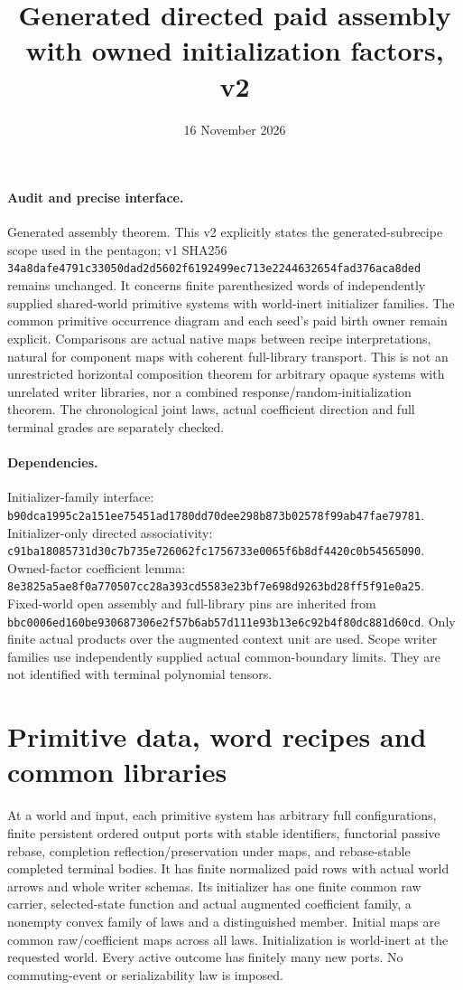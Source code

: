 \documentclass[11pt]{article}
\title{Generated directed paid assembly with owned initialization factors, v2}
\date{16 November 2026}
\begin{document}
\maketitle
\paragraph{Audit and precise interface.} Generated assembly theorem. This v2 explicitly states the generated-subrecipe scope used in the pentagon; v1 SHA256 \texttt{34a8dafe4791c33050dad2d5602f6192499ec713e2244632654fad376aca8ded} remains unchanged. It concerns finite parenthesized words of independently supplied shared-world primitive systems with world-inert initializer families. The common primitive occurrence diagram and each seed's paid birth owner remain explicit. Comparisons are actual native maps between recipe interpretations, natural for component maps with coherent full-library transport. This is not an unrestricted horizontal composition theorem for arbitrary opaque systems with unrelated writer libraries, nor a combined response/random-initialization theorem. The chronological joint laws, actual coefficient direction and full terminal grades are separately checked.

\paragraph{Dependencies.} Initializer-family interface: \texttt{b90dca1995c2a151ee75451ad1780dd70dee298b873b02578f99ab47fae79781}. Initializer-only directed associativity: \texttt{c91ba18085731d30c7b735e726062fc1756733e0065f6b8df4420c0b54565090}. Owned-factor coefficient lemma: \texttt{8e3825a5ae8f0a770507cc28a393cd5583e23bf7e698d9263bd28ff5f91e0a25}. Fixed-world open assembly and full-library pins are inherited from \texttt{bbc0006ed160be930687306e2f57b6ab57d111e93b13e6c92b4f80dc881d60cd}. Only finite actual products over the augmented context unit are used. Scope writer families use independently supplied actual common-boundary limits. They are not identified with terminal polynomial tensors.

\section{Primitive data, word recipes and common libraries}
At a world and input, each primitive system has arbitrary full configurations, finite persistent ordered output ports with stable identifiers, functorial passive rebase, completion reflection/preservation under maps, and rebase-stable completed terminal bodies. It has finite normalized paid rows with actual world arrows and whole writer schemas. Its initializer has one finite common raw carrier, selected-state function and actual augmented coefficient family, a nonempty convex family of laws and a distinguished member. Initial maps are common raw/coefficient maps across all laws. Initialization is world-inert at the requested world. Every active outcome has finitely many new ports. No commuting-event or serializability law is imposed.
\end{document}
